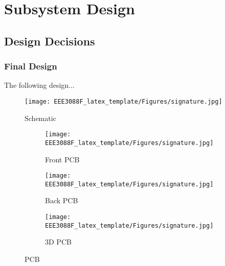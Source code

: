 \documentclass[class=report,11pt,crop=false]{standalone}
\begin{document}
\chapter{Subsystem Design} \label{ch:design}
\vspace{-1cm}
\section{Design Decisions}


\subsection{Final Design}
The following design...
\begin{figure}[h]
    \centering
    \texttt{[image: EEE3088F\_latex\_template/Figures/signature.jpg]}
    \caption{Schematic}
    \label{fig:schematic}
\end{figure}

\begin{figure}[h]
     \centering
    \begin{subfigure}[b]{0.3\linewidth}
        \texttt{[image: EEE3088F\_latex\_template/Figures/signature.jpg]}
        \caption{Front PCB}
        \label{fig:PCB_front}
    \end{subfigure}
    \hfill %
    \begin{subfigure}[b]{0.3\linewidth}
        \texttt{[image: EEE3088F\_latex\_template/Figures/signature.jpg]}
        \caption{Back PCB}
        \label{fig:PCB_back}
    \end{subfigure}
    \hfill %
    \begin{subfigure}[b]{0.3\linewidth}
        \texttt{[image: EEE3088F\_latex\_template/Figures/signature.jpg]}
        \caption{3D PCB}
        \label{fig:PCB_3D}
    \end{subfigure}
    \caption{PCB}
    \label{fig:PCB}
\end{figure}
\end{document}
